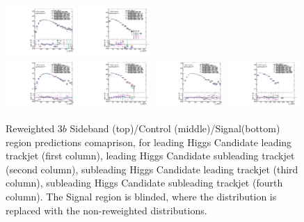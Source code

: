 \begin{figure}[htbp!]
\begin{center}
\includegraphics[angle=270, width=0.24\textwidth]{./figures/boosted/AppendixReweight/Compare/Data_ThreeTag_Control_directcompare_sublHCand_trk0_Pt_1.pdf}
\includegraphics[angle=270, width=0.24\textwidth]{./figures/boosted/AppendixReweight/Compare/Data_ThreeTag_Control_directcompare_sublHCand_trk1_Pt_1.pdf}\\
\includegraphics[angle=270, width=0.24\textwidth]{./figures/boosted/AppendixReweight/Compare/Data_ThreeTag_Signal_directcompare_leadHCand_trk0_Pt_1.pdf}
\includegraphics[angle=270, width=0.24\textwidth]{./figures/boosted/AppendixReweight/Compare/Data_ThreeTag_Signal_directcompare_leadHCand_trk1_Pt_1.pdf}
\includegraphics[angle=270, width=0.24\textwidth]{./figures/boosted/AppendixReweight/Compare/Data_ThreeTag_Signal_directcompare_sublHCand_trk0_Pt_1.pdf}
\includegraphics[angle=270, width=0.24\textwidth]{./figures/boosted/AppendixReweight/Compare/Data_ThreeTag_Signal_directcompare_sublHCand_trk1_Pt_1.pdf}\\
\caption{Reweighted 3$b$ Sideband (top)/Control (middle)/Signal(bottom) region predictions comaprison, for leading Higgs Candidate leading trackjet \pt (first column),  leading Higgs Candidate subleading trackjet \pt (second column), subleading Higgs Candidate leading trackjet \pt (third column), subleading Higgs Candidate subleading trackjet \pt (fourth column). The Signal region is blinded, where the distribution is replaced with the non-reweighted distributions.}
\label{fig:app-rw-comp-3b-trkjet}
\end{center}
\end{figure}


